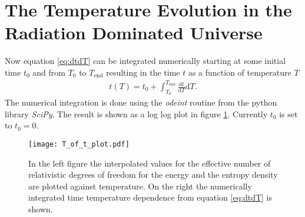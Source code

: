 \documentclass[twoside,a4paper, 12pt]{article}
\newcommand{\diff}{\mathrm{d}}
\numberwithin{equation}{section}
\begin{document}
\section{The Temperature Evolution in the Radiation Dominated Universe}
\label{sec:temperature_universe}
Now equation \eqref{eq:dtdT} can be integrated numerically
starting at some initial time $t_0$ and from
$T_0$ to $T_\mathrm{end}$ resulting in the time $t$ as a function of temperature $T$
\begin{align*}
    t(T) = t_0 + \int_{T_0}^{T_\mathrm{end}} \frac{\diff t}{\diff T} \diff T.
\end{align*}
The numerical integration is done using the \textit{odeint} routine
from the python library \textit{SciPy}. The result is shown
as a log log plot in figure \ref{fig:T_of_t_plot}.
Currently $t_0$ is set to $t_0 = 0$.
\begin{figure}[H]
    \centering
    \texttt{[image: T\_of\_t\_plot.pdf]}
    \caption{In the left figure the interpolated values for the effective number of relativistic degrees of freedom for the energy and the entropy density are plotted against temperature. On the right the numerically integrated
    time temperature dependence from equation \eqref{eq:dtdT} is shown.}
    \label{fig:T_of_t_plot}
\end{figure}
\end{document}

